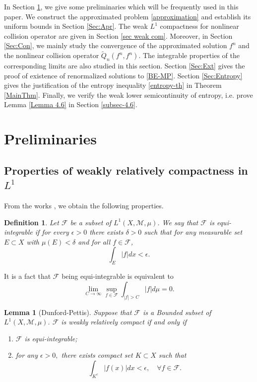 \documentclass[reqno,11pt]{amsart}
\newtheorem{definition}{Definition}[section]
\newtheorem{lemma}{Lemma}[section]
\numberwithin{equation}{section}
\begin{document}
In Section \ref{Sec:Prel}, we give some preliminaries which will be frequently used in this paper. We construct the approximated problem \eqref{approximation} and establish its uniform bounds in Section \ref{Sec:Apr}. The weak $L^1$ compactness for nonlinear collision operator are given in Section \ref{sec weak com}. Moreover, in Section \ref{Sec:Con}, we mainly study the convergence of the approximated solution $f^n$ and the nonlinear collision operator $\tilde{Q}_n (f^n, f^n)$. The integrable properties of the corresponding limits are also studied in this section. Section \ref{Sec:Ext} gives the proof of existence of renormalized solutions to \eqref{BE-MP}. Section \ref{Sec:Entropy} gives the justification of the entropy inequality \eqref{entropy-th} in Theorem \ref{MainThm}. Finally, we verify the weak lower semicontinuity of entropy, i.e. prove Lemma \ref{Lemma 4.6} in Section \ref{subsec-4.6}.


\section{Preliminaries}\label{Sec:Prel}

\subsection{Properties of weakly relatively compactness in $L^1$}
From the works \cite{ARKERYD-Boltz,R-de-la-Vallée-Poussin,Dunford-Schwartz-1958,Evans-1990-AMS}, we obtain the following properties.

\begin{definition}\label{def-equi}
	Let $\mathscr{F} $ be a subset of $L^1(X, \mathcal{M},\mu )$. We say that $\mathscr{F}$ is equi-integrable if for every $\epsilon >0 $ there exists $\delta >0 $ such that for any measurable set $E \subset X $ with $\mu (E ) < \delta $ and for all $f\in \mathscr{F}$,
	\begin{equation*}
		\int_{E} |f|dx < \epsilon .
	\end{equation*}
\end{definition}

It is a fact that $\mathscr{F} $ being equi-integrable is equivalent to 
	\begin{equation*}
		\lim \limits_{C \rightarrow \infty } \sup \limits_{f\in \mathscr{F }} \int_{|f|>C } |f|d \mu = 0 .
	\end{equation*}

	\begin{lemma}[Dunford-Pettis] \label{theorem-dunford}
	Suppose that $\mathscr{F}$ is a Bounded subset of $ L^1(X, \mathcal{M},\mu )$. $\mathscr{F}$ is weakly relatively compact if and only if 
	\begin{enumerate}
		\item {$\mathscr{F} $ is equi-integrable};
		\item {for any $\epsilon>0, $ there exists compact set $K \subset X$ such that 
			\begin{equation*}
				\int_{K^c} |f(x) | dx <\epsilon , \quad \forall f \in \mathscr{F}.
		\end{equation*}}
	\end{enumerate}
\end{lemma}
\end{document}
